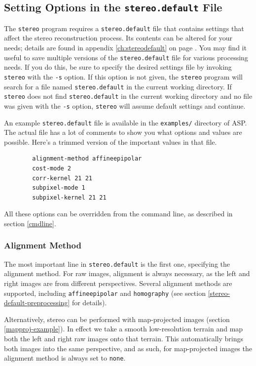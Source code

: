 \subsection{Setting Options in the \texttt{stereo.default} File}
\label{settingoptionsinstereodefault}

The \texttt{stereo} program requires a \texttt{stereo.default} file that
contains settings that affect the stereo reconstruction process.  Its
contents can be altered for your needs; details are found in appendix
\ref{ch:stereodefault} on page \pageref{ch:stereodefault}.  You may find
it useful to save multiple versions of the \texttt{stereo.default} file
for various processing needs. If you do this, be sure to specify the desired
settings file by invoking \texttt{stereo} with the \texttt{-s}
option.  If this option is not given, the \texttt{stereo} program will
search for a file named \texttt{stereo.default} in the current working
directory. If \texttt{stereo} does not find \texttt{stereo.default} in
the current working directory and no file was given with the \texttt{-s}
option, \texttt{stereo} will assume default settings and continue.

An example \texttt{stereo.default} file is available in the
\texttt{examples/} directory of \ac{ASP}. The actual file has a lot of
comments to show you what options and values are possible. Here's a
trimmed version of the important values in that file.
\begin{verbatim}
        alignment-method affineepipolar
        cost-mode 2
        corr-kernel 21 21
        subpixel-mode 1
        subpixel-kernel 21 21
\end{verbatim}

All these options can be overridden from the command line, as described
in section \ref{cmdline}.

\subsubsection*{Alignment Method}

The most important line in \texttt{stereo.default} is the
first one, specifying the alignment method. For raw images, alignment is
always necessary, as the left and right images are from different
perspectives. Several alignment methods are supported, including
\texttt{affineepipolar} and \texttt{homography} (see section
\ref{stereo-default-preprocessing} for details).

Alternatively, stereo can be performed with map-projected images
(section \ref{mapproj-example}). In effect we take a smooth
low-resolution terrain and map both the left and right raw images onto
that terrain. This automatically brings both images into the same
perspective, and as such, for map-projected images the alignment method
is always set to \texttt{none}.

